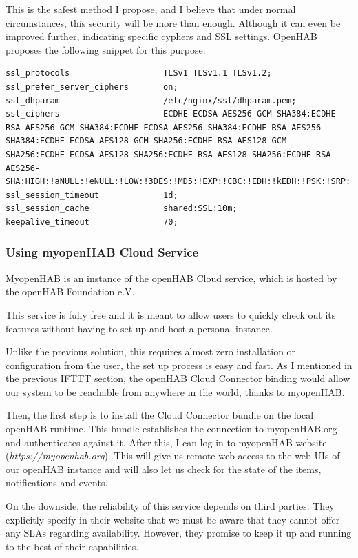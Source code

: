 This is the safest method I propose, and I believe that under normal circumstances, this security will be more than enough.
Although it can even be improved further, indicating specific cyphers and SSL settings. OpenHAB proposes the following snippet for
this purpose:

\begin{lstlisting}[style=Consola]
ssl_protocols                   TLSv1 TLSv1.1 TLSv1.2;
ssl_prefer_server_ciphers       on;
ssl_dhparam                     /etc/nginx/ssl/dhparam.pem;
ssl_ciphers                     ECDHE-ECDSA-AES256-GCM-SHA384:ECDHE-RSA-AES256-GCM-SHA384:ECDHE-ECDSA-AES256-SHA384:ECDHE-RSA-AES256-SHA384:ECDHE-ECDSA-AES128-GCM-SHA256:ECDHE-RSA-AES128-GCM-SHA256:ECDHE-ECDSA-AES128-SHA256:ECDHE-RSA-AES128-SHA256:ECDHE-RSA-AES256-SHA:HIGH:!aNULL:!eNULL:!LOW:!3DES:!MD5:!EXP:!CBC:!EDH:!kEDH:!PSK:!SRP:!kECDH;
ssl_session_timeout             1d;
ssl_session_cache               shared:SSL:10m;
keepalive_timeout               70;
\end{lstlisting}

\subsubsection{Using myopenHAB Cloud Service}
MyopenHAB is an instance of the openHAB Cloud service, which is hosted by the openHAB Foundation e.V.

This service is fully free and it is meant to allow users to quickly check out its features without having to set up and host a 
personal instance.

Unlike the previous solution, this requires almost zero installation or configuration from the user, the set up process is easy
and fast. As I mentioned in the previous IFTTT section, the openHAB Cloud Connector binding would allow our system to be reachable
from anywhere in the world, thanks to myopenHAB.

Then, the first step is to install the Cloud Connector bundle on the local openHAB runtime. This bundle establishes the connection 
to myopenHAB.org and authenticates against it. After this, I can log in to myopenHAB website (\textit{https://myopenhab.org}).
This will give us remote web access to the web UIs of our openHAB instance and will also let us check for the state of the items, 
notifications and events.

On the downside, the reliability of this service depends on third parties. They explicitly specify in their website\cite{myopenHAB}
that we must be aware that they cannot offer any SLAs regarding availability. However, they promise to keep it up and running to 
the best of their capabilities.

